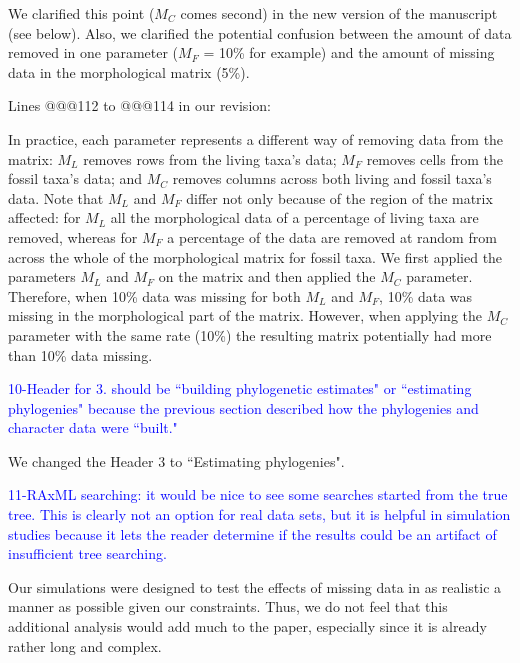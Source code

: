 \documentclass[11pt]{letter}
\begin{document}
\begin{letter}{}
We clarified this point ($M_C$ comes second) in the new version of the manuscript (see below). Also, we clarified the potential confusion between the amount of data removed in one parameter ($M_F$ = 10\% for example) and the amount of missing data in the morphological matrix (5\%).

Lines @@@112 to @@@114 in our revision: 

\hfill\begin{minipage}{\dimexpr\textwidth-1cm}
In practice, each parameter represents a different way of removing data from the matrix: $M_L$ removes rows from the living taxa's data; $M_F$ removes cells from the fossil taxa's data; and $M_C$ removes columns across both living and fossil taxa's data. Note that $M_L$ and $M_F$ differ not only because of the region of the matrix affected: for $M_L$ all the morphological data of a percentage of living taxa are removed, whereas for $M_F$ a percentage of the data are removed at random from across the whole of the morphological matrix for fossil taxa. We first applied the parameters $M_L$ and $M_F$ on the matrix and then applied the $M_C$ parameter. Therefore, when 10\% data was missing for both $M_L$ and $M_F$, 10\% data was missing in the morphological part of the matrix. However, when applying the $M_C$ parameter with the same rate (10\%) the resulting matrix potentially had more than 10\% data missing.
\end{minipage}


\textcolor{blue}{10-Header for 3. should be ``building phylogenetic estimates" or ``estimating phylogenies" because the previous section described how the phylogenies and character data were ``built."}

We changed the Header 3 to ``Estimating phylogenies".


\textcolor{blue}{11-RAxML searching: it would be nice to see some searches started from the true tree. This is clearly not an option for real data sets, but it is helpful in simulation studies because it lets the reader determine if the results could be an artifact of insufficient tree searching.}

Our simulations were designed to test the effects of missing data in as realistic a manner as possible given our constraints. Thus, we do not feel that this additional analysis would add much to the paper, especially since it is already rather long and complex. 


\end{letter}
\end{document}
